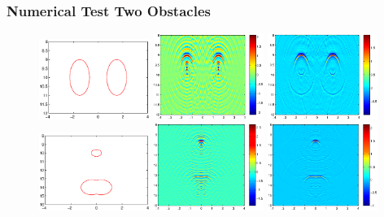 \documentclass[cjk,8pt]{beamer}
\begin{document}
\begin{CJK*}{GBK}{kai}
\begin{frame}
\frametitle{Numerical Test Two Obstacles}
\begin{figure}[h]
	
	\includegraphics[width=0.32\textwidth,height=0.31\textheight]{./graphic/bi_circle_profile.eps}
	\includegraphics[width=0.32\textwidth]{./graphic/bi_circle_3pi.eps}
	\includegraphics[width=0.32\textwidth]{./graphic/bi_circle.eps}\\
	\includegraphics[width=0.32\textwidth,height=0.31\textheight]{./graphic/circle_0_4_peanut_1_profile.eps}
	\includegraphics[width=0.32\textwidth]{./graphic/circle_0_4_peanut_1_3pi_1.eps}
	\includegraphics[width=0.32\textwidth]{./graphic/circle_0_4_peanut_1_multi_1.eps}
	

\end{figure}
\end{frame}
\end{CJK*}
\end{document}
